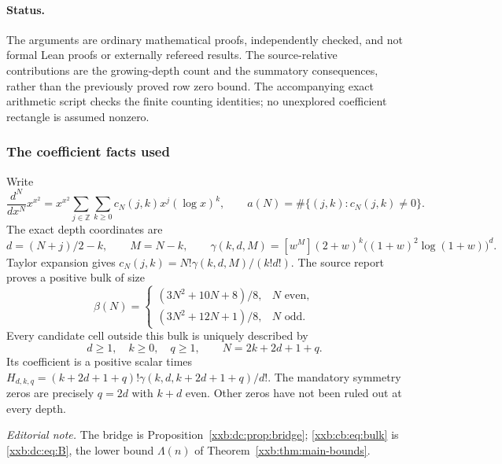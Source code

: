 \documentclass[11pt,a4paper]{article}
\numberwithin{equation}{section}
\theoremstyle{definition}
\theoremstyle{remark}
\theoremstyle{plain}
\newcommand{\Z}{\mathbb Z}
\begin{document}
\paragraph{Status.}
The arguments are ordinary mathematical proofs, independently checked, and not
formal Lean proofs or externally refereed results. The source-relative
contributions are the growing-depth count and the summatory consequences,
rather than the previously proved row zero bound. The accompanying exact
arithmetic script checks the finite counting identities; no unexplored
coefficient rectangle is assumed nonzero.

\subsubsection{The coefficient facts used}

Write
\[
 \frac{d^N}{dx^N}x^{x^2}
 =x^{x^2}\sum_{j\in\Z}\sum_{k\ge0}c_N(j,k)x^j(\log x)^k,
 \qquad a(N)=\#\{(j,k):c_N(j,k)\ne0\}.
\]
The exact depth coordinates are
\[
 d=(N+j)/2-k,\qquad M=N-k,\qquad
 \gamma(k,d,M)=[w^M](2+w)^k\bigl((1+w)^2\log(1+w)\bigr)^d.
\]
Taylor expansion gives $c_N(j,k)=N!\gamma(k,d,M)/(k!d!)$.
The source report proves a positive bulk of size
\begin{equation}\label{xxb:cb:eq:bulk}
 \beta(N)=
 \begin{cases}
 (3N^2+10N+8)/8,&N\text{ even},\\
 (3N^2+12N+1)/8,&N\text{ odd}.
 \end{cases}
\end{equation}
Every candidate cell outside this bulk is uniquely described by
\begin{equation}\label{xxb:cb:eq:tail}
 d\ge1,\quad k\ge0,\quad q\ge1,\qquad N=2k+2d+1+q.
\end{equation}
Its coefficient is a positive scalar times
$H_{d,k,q}=(k+2d+1+q)!\gamma(k,d,k+2d+1+q)/d!$.
The mandatory symmetry zeros are precisely $q=2d$ with $k+d$ even. Other zeros
have not been ruled out at every depth.

\emph{Editorial note.}  The bridge is Proposition~\ref{xxb:dc:prop:bridge};
\eqref{xxb:cb:eq:bulk} is \eqref{xxb:dc:eq:B}, the lower bound $\Lambda(n)$ of
Theorem~\ref{xxb:thm:main-bounds}.
\end{document}
